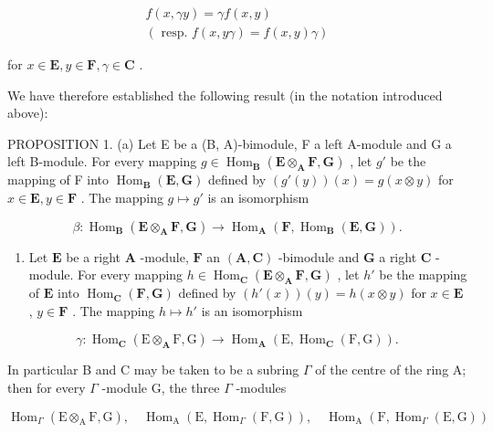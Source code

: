 \[
\begin{array}{c} f (x, \gamma y) = \gamma f (x, y) \\ (\text { resp. } f (x, y \gamma) = f (x, y) \gamma) \end{array}
\]

for \(x \in \mathbf{E}, y \in \mathbf{F}, \gamma \in \mathbf{C}\) .

We have therefore established the following result (in the notation introduced above):

PROPOSITION 1. (a) Let E be a (B, A)-bimodule, F a left A-module and G a left B-module. For every mapping \(g \in \operatorname{Hom}_{\mathbf{B}}(\mathbf{E} \otimes_{\mathbf{A}} \mathbf{F}, \mathbf{G})\) , let \(g'\) be the mapping of F into \(\operatorname{Hom}_{\mathbf{B}}(\mathbf{E}, \mathbf{G})\) defined by \((g'(y))(x) = g(x \otimes y)\) for \(x \in \mathbf{E}, y \in \mathbf{F}\) . The mapping \(g \mapsto g'\) is an isomorphism

\[
\beta : \operatorname{Hom} _ {\mathbf {B}} (\mathbf {E} \otimes_ {\mathbf {A}} \mathbf {F}, \mathbf {G}) \rightarrow \operatorname{Hom} _ {\mathbf {A}} (\mathbf {F}, \operatorname{Hom} _ {\mathbf {B}} (\mathbf {E}, \mathbf {G})).\tag{5}
\]

\begin{enumerate}
\def\labelenumi{(\alph{enumi})}
\setcounter{enumi}{1}
\tightlist
\item
  Let \(\mathbf{E}\) be a right \(\mathbf{A}\) -module, \(\mathbf{F}\) an \((\mathbf{A}, \mathbf{C})\) -bimodule and \(\mathbf{G}\) a right \(\mathbf{C}\) -module. For every mapping \(h \in \operatorname{Hom}_{\mathbf{C}}(\mathbf{E} \otimes_{\mathbf{A}} \mathbf{F}, \mathbf{G})\) , let \(h'\) be the mapping of \(\mathbf{E}\) into \(\operatorname{Hom}_{\mathbf{C}}(\mathbf{F}, \mathbf{G})\) defined by \((h'(x))(y) = h(x \otimes y)\) for \(x \in \mathbf{E}\) , \(y \in \mathbf{F}\) . The mapping \(h \mapsto h'\) is an isomorphism
\end{enumerate}

\[
\gamma : \operatorname{Hom} _ {\mathbf {C}} (\mathrm{E} \otimes_ {\mathbf {A}} \mathrm{F}, \mathrm{G}) \rightarrow \operatorname{Hom} _ {\mathbf {A}} (\mathrm{E}, \operatorname{Hom} _ {\mathbf {C}} (\mathrm{F}, \mathrm{G})).\tag{6}
\]

In particular B and C may be taken to be a subring \(\Gamma\) of the centre of the ring A; then for every \(\Gamma\) -module G, the three \(\Gamma\) -modules

\[
\operatorname{Hom} _ {\Gamma} (\mathrm{E} \otimes_ {\mathrm{A}} \mathrm{F}, \mathrm{G}), \quad \operatorname{Hom} _ {\mathrm{A}} (\mathrm{E}, \operatorname{Hom} _ {\Gamma} (\mathrm{F}, \mathrm{G})), \quad \operatorname{Hom} _ {\mathrm{A}} (\mathrm{F}, \operatorname{Hom} _ {\Gamma} (\mathrm{E}, \mathrm{G}))
\]


